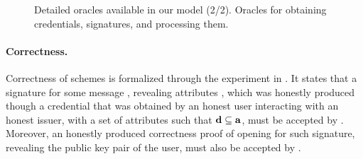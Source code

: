 {\begin{figure*}[htp!]
{\begin{minipage}[t]{.5\textwidth}
        
      \end{minipage}
      
    }

    \caption{Detailed oracles available in our model (2/2). Oracles for
      obtaining credentials, signatures, and processing them.}
    \label{fig:oracles}
  \end{figure*}
}

\paragraph{Correctness.} %
Correctness of \UAS schemes is formalized through the experiment in
. It states that a signature for some message \msg,
revealing attributes \dattrs, which was honestly produced though a credential
that was obtained by an honest user interacting with an honest issuer, with a
set of attributes \attrs such that $\mathbf{d} \subseteq \mathbf{a}$, must be accepted
by \Verify. Moreover, an honestly produced correctness proof of opening for such
signature, revealing the public key pair of the user, must also be accepted by
\Judge.

